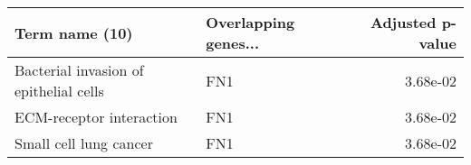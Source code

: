 \begin{tabular}{llr}
\toprule
                        Term name (10) & Overlapping genes... &  Adjusted p-value \\
\midrule
Bacterial invasion of epithelial cells &                  FN1 &          3.68e-02 \\
              ECM-receptor interaction &                  FN1 &          3.68e-02 \\
                Small cell lung cancer &                  FN1 &          3.68e-02 \\
\bottomrule
\end{tabular}
